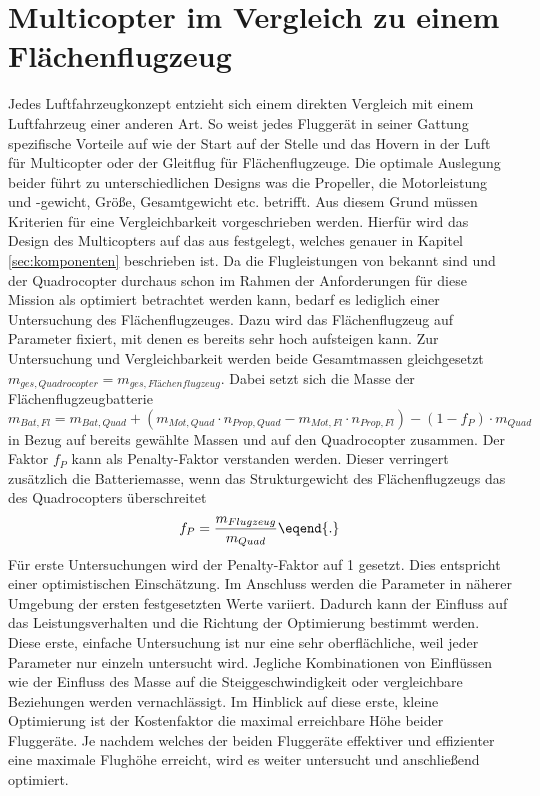 \section{Multicopter im Vergleich zu einem Flächenflugzeug}
\label{sec:multicopter_vs_flaechenflugzeug}
Jedes Luftfahrzeugkonzept entzieht sich einem direkten Vergleich mit einem Luftfahrzeug einer anderen Art. So weist jedes Fluggerät in seiner Gattung spezifische Vorteile auf wie der Start auf der Stelle und das Hovern in der Luft für Multicopter oder der Gleitflug für Flächenflugzeuge. Die optimale Auslegung beider führt zu unterschiedlichen Designs was die Propeller, die Motorleistung und -gewicht, Größe, Gesamtgewicht etc. betrifft. Aus diesem Grund müssen Kriterien für eine Vergleichbarkeit vorgeschrieben werden. Hierfür wird das Design des Multicopters auf das aus \cite{Anderson.2018} festgelegt, welches genauer in Kapitel \ref{sec:komponenten} beschrieben ist. Da die Flugleistungen von \cite{Anderson.2018} bekannt sind und der Quadrocopter durchaus schon im Rahmen der Anforderungen für diese Mission als optimiert betrachtet werden kann, bedarf es lediglich einer Untersuchung des Flächenflugzeuges. Dazu wird das Flächenflugzeug auf Parameter fixiert, mit denen es bereits sehr hoch aufsteigen kann. Zur Untersuchung und Vergleichbarkeit werden beide Gesamtmassen gleichgesetzt \ensuremath{m_{ges,Quadrocopter} = m_{ges,Flächenflugzeug}}. Dabei setzt sich die Masse der Flächenflugzeugbatterie   
\begin{equation}
	m_{Bat,Fl} = m_{Bat,Quad} + (m_{Mot,Quad}\cdot n_{Prop,Quad} - m_{Mot,Fl}\cdot n_{Prop,Fl}) - (1-f_P)\cdot m_{Quad}  
\end{equation}
in Bezug auf bereits gewählte Massen und auf den Quadrocopter zusammen. Der Faktor \ensuremath{f_P} kann als Penalty-Faktor verstanden werden. Dieser verringert zusätzlich die Batteriemasse, wenn das Strukturgewicht des Flächenflugzeugs das des Quadrocopters überschreitet
\begin{equation}
	f_P = \frac{m_{Flugzeug}}{m_{Quad}} \eqend{.}
	\label{eq:penalty}
\end{equation} 
Für erste Untersuchungen wird der Penalty-Faktor auf 1 gesetzt. Dies entspricht einer optimistischen Einschätzung. Im Anschluss werden die Parameter in näherer Umgebung der ersten festgesetzten Werte variiert. Dadurch kann der Einfluss auf das Leistungsverhalten und die Richtung der Optimierung bestimmt werden. Diese erste, einfache Untersuchung ist nur eine sehr oberflächliche, weil jeder Parameter nur einzeln untersucht wird. Jegliche Kombinationen von Einflüssen wie der Einfluss des Masse auf die Steiggeschwindigkeit oder vergleichbare Beziehungen werden vernachlässigt. Im Hinblick auf diese erste, kleine Optimierung ist der Kostenfaktor die maximal erreichbare Höhe beider Fluggeräte. Je nachdem welches der beiden Fluggeräte effektiver und effizienter eine maximale Flughöhe erreicht, wird es weiter untersucht und anschließend optimiert.  

